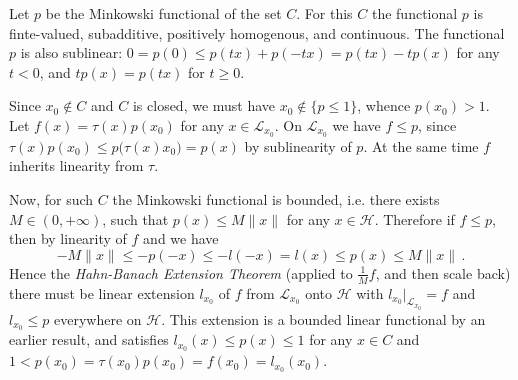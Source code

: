 \documentclass[a4paper]{article}
\newcommand{\Hcal}{\mathcal{H}}
\newcommand{\Lcal}{\mathcal{L}}
\begin{document}
Let $p$ be the Minkowski functional of the set $C$. For this $C$ the functional $p$
is finte-valued, subadditive, positively homogenous, and continuous. The functional
$p$ is also sublinear: $0 = p(0) \leq p(t x) + p(-t x) = p(t x) - t p(x)$ for any
$t < 0$, and $t p(x) = p(t x)$ for $t \geq 0$.

Since $x_0\notin C$ and $C$ is closed, we must have $x_0\notin \{p\leq 1\}$, whence
$p(x_0) > 1$. Let $f(x) = \tau(x) p(x_0)$ for any $x \in \Lcal_{x_0}$. On $\Lcal_{x_0}$
we have $f\leq p$, since $\tau(x) p(x_0) \leq p\bigl(\tau(x) x_0\bigr) = p(x)$ by
sublinearity of $p$. At the same time $f$ inherits linearity from $\tau$.

Now, for such $C$ the Minkowski functional is bounded, i.e. there exists $M \in (0,
+\infty)$, such that $p(x) \leq M \|x\|$ for any $x\in \Hcal$. Therefore if $f\leq
p$, then by linearity of $f$ and we have
\begin{equation*}
  - M \|x\|
    \leq - p(-x)
    \leq -l(- x)
    = l(x)
    \leq p(x)
    \leq M \|x\|
    \,.
\end{equation*}
Hence the {\it Hahn-Banach Extension Theorem} (applied to $\tfrac1M f$, and then
scale back) there must be linear extension $l_{x_0}$ of $f$ from $\Lcal_{x_0}$ onto
$\Hcal$ with $l_{x_0}\big\vert_{\Lcal_{x_0}} = f$ and $l_{x_0} \leq p$ everywhere
on $\Hcal$. This extension is a bounded linear functional by an earlier result, and
satisfies $l_{x_0}(x) \leq p(x) \leq 1$ for any $x\in C$ and $1 < p(x_0) = \tau(x_0) p(x_0)
= f(x_0) = l_{x_0}(x_0)$.

\end{document}
